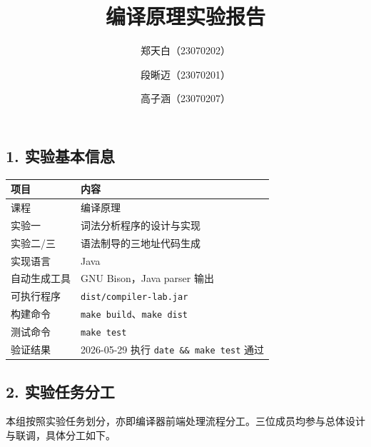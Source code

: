 \documentclass[
  a4paper,
  fontset=none,
]{ctexart}
\title{编译原理实验报告}
\author{郑天白（23070202）\and 段晰迈（23070201）\and 高子涵（23070207）}
\date{}
\begin{document}
\maketitle
\tableofcontents
\newpage

\hypertarget{ux5b9eux9a8cux57faux672cux4fe1ux606f}{%
\subsection{1.
实验基本信息}\label{ux5b9eux9a8cux57faux672cux4fe1ux606f}}

\begin{longtable}[]{@{}ll@{}}
\toprule\noalign{}
项目 & 内容 \\
\midrule\noalign{}
\endhead
\bottomrule\noalign{}
\endlastfoot
课程 & 编译原理 \\
实验一 & 词法分析程序的设计与实现 \\
实验二/三 & 语法制导的三地址代码生成 \\
实现语言 & Java \\
自动生成工具 & GNU Bison，Java parser 输出 \\
可执行程序 & \texttt{dist/compiler-lab.jar} \\
构建命令 & \texttt{make\ build}、\texttt{make\ dist} \\
测试命令 & \texttt{make\ test} \\
验证结果 & 2026-05-29 执行 \texttt{date\ \&\&\ make\ test} 通过 \\
\end{longtable}

\hypertarget{ux5b9eux9a8cux4efbux52a1ux5206ux5de5}{%
\subsection{2.
实验任务分工}\label{ux5b9eux9a8cux4efbux52a1ux5206ux5de5}}

本组按照实验任务划分，亦即编译器前端处理流程分工。三位成员均参与总体设计与联调，具体分工如下。
\end{document}
